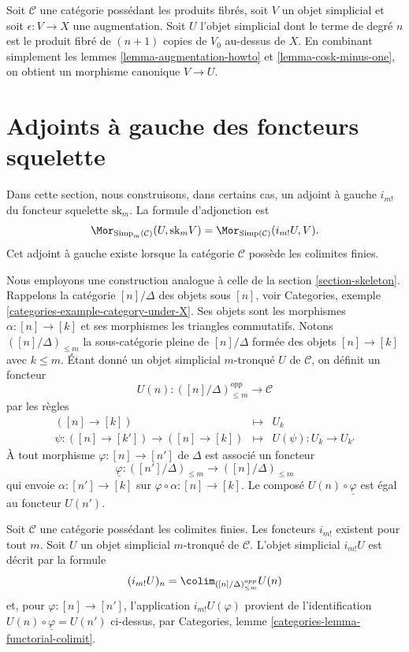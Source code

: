 \begin{remark}
\label{remark-augmentation}
Soit $\mathcal{C}$ une catégorie possédant les produits fibrés, soit $V$
un objet simplicial et soit $\epsilon : V \to X$ une augmentation.
Soit $U$ l'objet simplicial dont le terme de degré $n$ est le produit
fibré de $(n + 1)$ copies de $V_0$ au-dessus de $X$. En combinant simplement
les lemmes \ref{lemma-augmentation-howto} et
\ref{lemma-cosk-minus-one}, on obtient un morphisme canonique $V \to U$.
\end{remark}
\section{Adjoints à gauche des foncteurs squelette}
\label{section-adjoint-left}

\noindent
Dans cette section, nous construisons, dans certains cas, un adjoint à
gauche $i_{m!}$ du foncteur squelette $\text{sk}_m$. La formule
d'adjonction est
$$
\Mor_{\text{Simp}_m(\mathcal{C})}(U, \text{sk}_mV)
=
\Mor_{\text{Simp}(\mathcal{C})}(i_{m!}U, V).
$$
Cet adjoint à gauche existe lorsque la catégorie $\mathcal{C}$ possède
les colimites finies.

\medskip\noindent
Nous employons une construction analogue à celle de la section
\ref{section-skeleton}. Rappelons la catégorie $[n]/\Delta$ des objets
sous $[n]$, voir Categories, exemple
\ref{categories-example-category-under-X}. Ses objets sont les morphismes
$\alpha : [n] \to [k]$ et ses morphismes les triangles commutatifs.
Notons $([n]/\Delta)_{\leq m}$ la sous-catégorie pleine de
$[n]/\Delta$ formée des objets $[n] \to [k]$ avec $k \leq m$.
Étant donné un objet simplicial $m$-tronqué $U$ de $\mathcal{C}$,
on définit un foncteur
$$
U(n) : ([n]/\Delta)_{\leq m}^{opp} \longrightarrow \mathcal{C}
$$
par les règles
\begin{eqnarray*}
([n] \to [k]) & \longmapsto & U_k \\
\psi : ([n] \to [k']) \to ([n] \to [k])
& \longmapsto &
U(\psi) : U_k \to U_{k'}
\end{eqnarray*}
À tout morphisme $\varphi : [n] \to [n']$ de $\Delta$ est associé un foncteur
$$
\underline{\varphi} :
([n']/\Delta)_{\leq m}
\longrightarrow
([n]/\Delta)_{\leq m}
$$
qui envoie $\alpha : [n'] \to [k]$ sur
$\varphi \circ \alpha : [n] \to [k]$. Le composé
$U(n) \circ \underline{\varphi}$ est égal au foncteur $U(n')$.

\begin{lemma}
\label{lemma-left-adjoint-exists}
Soit $\mathcal{C}$ une catégorie possédant les colimites finies.
Les foncteurs $i_{m!}$ existent pour tout $m$. Soit $U$ un objet
simplicial $m$-tronqué de $\mathcal{C}$. L'objet simplicial $i_{m!}U$
est décrit par la formule
$$
(i_{m!}U)_n = \colim_{([n]/\Delta)_{\leq m}^{opp}} U(n)
$$
et, pour $\varphi : [n] \to [n']$, l'application
$i_{m!}U(\varphi)$ provient de l'identification
$U(n) \circ \underline{\varphi} = U(n')$ ci-dessus, par Categories,
lemme \ref{categories-lemma-functorial-colimit}.
\end{lemma}

